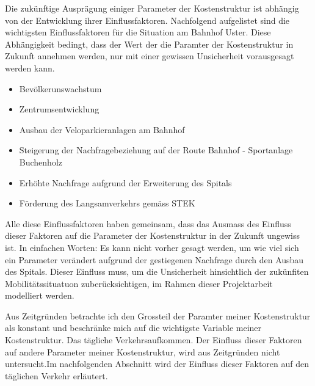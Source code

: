 %
%
%
%


Die zukünftige Ausprägung einiger Parameter der Kostenstruktur ist abhängig von der Entwicklung ihrer Einflussfaktoren. Nachfolgend aufgelistet sind die wichtigsten Einflussfaktoren für die Situation am Bahnhof Uster. Diese Abhängigkeit bedingt, dass der Wert der die Paramter der Kostenstruktur in Zukunft annehmen werden, nur mit einer gewissen Unsicherheit vorausgesagt werden kann.  \\

{
\begin{itemize}
\item Bevölkerunswachstum
\item Zentrumsentwicklung
\item Ausbau der Veloparkieranlagen am Bahnhof 
\item Steigerung der Nachfragebeziehung auf der Route Bahnhof - Sportanlage Buchenholz
\item Erhöhte Nachfrage aufgrund der Erweiterung des Spitals
\item Förderung des Langsamverkehrs gemäss STEK 
\end{itemize}
}

Alle diese Einflussfaktoren haben gemeinsam, dass das Ausmass des Einfluss dieser Faktoren auf die Parameter der Kostenstruktur in der Zukunft ungewiss ist. In einfachen Worten: Es kann nicht vorher gesagt werden, um wie viel sich ein Parameter verändert aufgrund der gestiegenen Nachfrage durch den Ausbau des Spitals. Dieser Einfluss muss, um die Unsicherheit hinsichtlich der zukünfiten Mobilitätssituatuon zuberücksichtigen, im Rahmen dieser Projektarbeit modelliert werden. 
 
Aus Zeitgründen betrachte ich den Grossteil der Paramter meiner Kostenstruktur als konstant und beschränke mich auf die wichtigste Variable  meiner Kostenstruktur. Das tägliche Verkehrsaufkommen. Der Einfluss dieser Faktoren auf andere Parameter meiner Kostenstruktur, wird aus Zeitgründen nicht untersucht.Im nachfolgenden Abschnitt wird der Einfluss dieser Faktoren auf den täglichen Verkehr erläutert.


